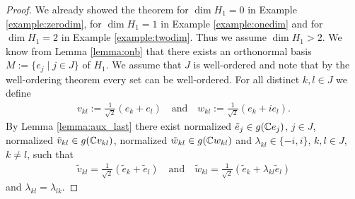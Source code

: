 \begin{proof}
	We already showed the theorem for $\dim H_1 = 0$ in Example \ref{example:zerodim}, for $\dim H_1 = 1$ in Example \ref{example:onedim} and for $\dim H_1 = 2$ in Example \ref{example:twodim}. Thus we assume $\dim H_1 > 2$. We know from Lemma \ref{lemma:onb} that there exists an orthonormal basis $M := \{e_j \mid j \in J\}$ of $H_1$. We assume that $J$ is well-ordered and note that by the well-ordering theorem every set can be well-ordered. For all distinct $k,l \in J$ we define
	\begin{align*}
		v_{kl} := \frac{1}{\sqrt{2}}(e_k + e_l) \quad \text{and} \quad w_{kl} := \frac{1}{\sqrt{2}}(e_k + ie_l).
	\end{align*}
	 By Lemma \ref{lemma:aux_last} there exist normalized $\tilde{e}_j \in g(\mathbb{C} e_j)$, $j \in J$, normalized $\tilde{v}_{kl} \in g(\mathbb{C} v_{kl})$, normalized $\tilde{w}_{kl} \in g(\mathbb{C} w_{kl})$ and $\lambda_{kl} \in \{-i, i\}$, $k,l \in J$, $k \neq l$, such that 
	 \begin{align*}
	 \tilde{v}_{kl} = \frac{1}{\sqrt{2}}(\tilde{e}_k + \tilde{e}_l) \quad \text{and} \quad \tilde{w}_{kl} = \frac{1}{\sqrt{2}}(\tilde{e}_k + \lambda_{kl} \tilde{e}_l)
	 \end{align*}
	 and $\lambda_{kl} = \lambda_{lk}$. 
	 

\end{proof}
